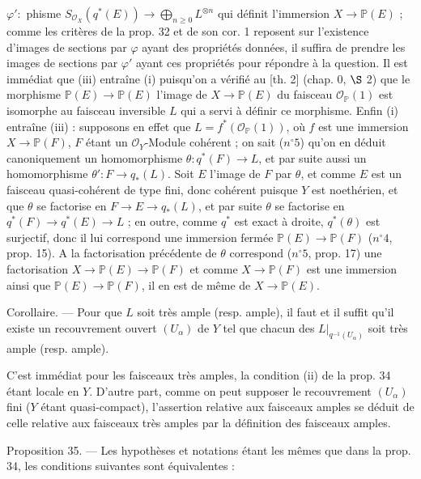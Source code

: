 $\varphi' :$ phisme $S_{\mathcal{O}_X}(q^*(E)) \to \bigoplus_{n \ge 0} L^{\otimes n}$ qui définit l'immersion $X \to \mathbb{P}(E)$ ; comme les critères de la prop. 32 et de son cor. 1 reposent sur l'existence d'images de sections par $\varphi$ ayant des propriétés données, il suffira de prendre les images de sections par $\varphi'$ ayant ces propriétés pour répondre à la question. Il est immédiat que (iii) entraîne (i) puisqu'on a vérifié au [th. 2] (chap. 0, $\S$ 2) que le morphisme  $\mathbb{P}(E) \to \mathbb{P}(E)$ l'image de $X \to \mathbb{P}(E)$ du faisceau $\mathcal{O}_{\mathbb{P}}(1)$ est isomorphe au faisceau inversible $L$ qui a servi à définir ce morphisme. Enfin (i) entraîne (iii) : supposons en effet que $L = f^*(\mathcal{O}_{\mathbb{P}}(1))$, où $f$ est une immersion $X \to \mathbb{P}(F)$, $F$ étant un $\mathcal{O}_Y$-Module cohérent ; on sait ($n^\circ 5$) qu'on en déduit canoniquement un homomorphisme $\theta : q^*(F) \to L$, et par suite aussi un homomorphisme $\theta' : F \to q_*(L)$. Soit $E$ l'image de $F$ par $\theta$, et comme $E$ est un faisceau quasi-cohérent de type fini, donc cohérent puisque $Y$ est noethérien, et que $\theta$ se factorise en $F \to E \to q_*(L)$, et par suite $\theta$ se factorise en $q^*(F) \to q^*(E) \to L$ ; en outre, comme $q^*$ est exact à droite, $q^*(\theta)$ est surjectif, donc il lui correspond une immersion fermée $\mathbb{P}(E) \to \mathbb{P}(F)$ ($n^\circ 4$, prop. 15). A la factorisation précédente de $\theta$ correspond ($n^\circ 5$, prop. 17) une factorisation $X \to \mathbb{P}(E) \to \mathbb{P}(F)$ et comme $X \to \mathbb{P}(F)$ est une immersion ainsi que $\mathbb{P}(E) \to \mathbb{P}(F)$, il en est de même de $X \to \mathbb{P}(E)$.

Corollaire. — Pour que $L$ soit très ample (resp. ample), il faut et il suffit qu'il existe un recouvrement ouvert $(U_\alpha)$ de $Y$ tel que chacun des $L|_{q^{-1}(U_\alpha)}$ soit très ample (resp. ample).

C'est immédiat pour les faisceaux très amples, la condition (ii) de la prop. 34 étant locale en $Y$. D'autre part, comme on peut supposer le recouvrement $(U_\alpha)$ fini ($Y$ étant quasi-compact), l'assertion relative aux faisceaux amples se déduit de celle relative aux faisceaux très amples par la définition des faisceaux amples.

Proposition 35. — Les hypothèses et notations étant les mêmes que dans la prop. 34, les conditions suivantes sont équivalentes :

\newpage

